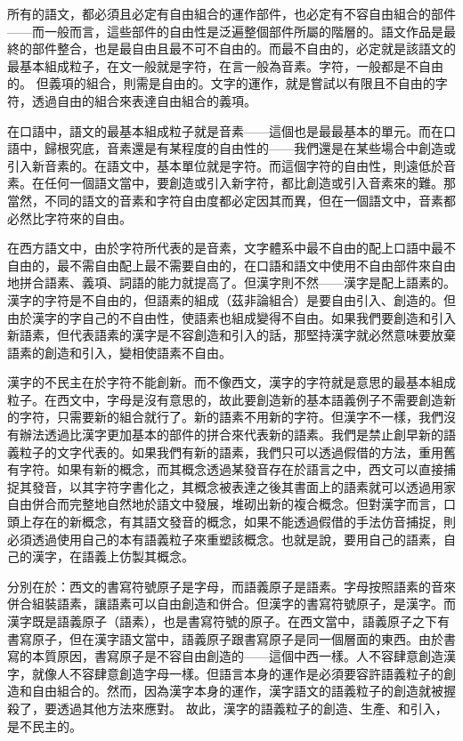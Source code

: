 \documentclass[a5paper, 10pt, openany]{book} %
\begin{document}
所有的語文，都必須且必定有自由組合的運作部件，也必定有不容自由組合的部件——而一般而言，這些部件的自由性是泛遍整個部件所屬的階層的。語文作品是最終的部件整合，也是最自由且最不可不自由的。而最不自由的，必定就是該語文的最基本組成粒子，在文一般就是字符，在言一般為音素。字符，一般都是不自由的。 但義項的組合，則需是自由的。文字的運作，就是嘗試以有限且不自由的字符，透過自由的組合來表達自由組合的義項。

在口語中，語文的最基本組成粒子就是音素——這個也是最最基本的單元。而在口語中，歸根究底，音素還是有某程度的自由性的——我們還是在某些場合中創造或引入新音素的。在語文中，基本單位就是字符。而這個字符的自由性，則遠低於音素。在任何一個語文當中，要創造或引入新字符，都比創造或引入音素來的難。那當然，不同的語文的音素和字符自由度都必定因其而異，但在一個語文中，音素都必然比字符來的自由。

在西方語文中，由於字符所代表的是音素，文字體系中最不自由的配上口語中最不自由的，最不需自由配上最不需要自由的，在口語和語文中使用不自由部件來自由地拼合語素、義項、詞語的能力就提高了。但漢字則不然——漢字是配上語素的。漢字的字符是不自由的，但語素的組成（茲非論組合）是要自由引入、創造的。但由於漢字的字自己的不自由性，使語素也組成變得不自由。如果我們要創造和引入新語素，但代表語素的漢字是不容創造和引入的話，那堅持漢字就必然意味要放棄語素的創造和引入，變相使語素不自由。

漢字的不民主在於字符不能創新。而不像西文，漢字的字符就是意思的最基本組成粒子。在西文中，字母是沒有意思的，故此要創造新的基本語義例子不需要創造新的字符，只需要新的組合就行了。新的語素不用新的字符。但漢字不一樣，我們沒有辦法透過比漢字更加基本的部件的拼合來代表新的語素。我們是禁止創早新的語義粒子的文字代表的。如果我們有新的語素，我們只可以透過假借的方法，重用舊有字符。如果有新的概念，而其概念透過某發音存在於語言之中，西文可以直接捕捉其發音，以其字符字書化之，其概念被表達之後其書面上的語素就可以透過用家自由併合而完整地自然地於語文中發展，堆砌出新的複合概念。但對漢字而言，口頭上存在的新概念，有其語文發音的概念，如果不能透過假借的手法仿音捕捉，則必須透過使用自己的本有語義粒子來重塑該概念。也就是說，要用自己的語素，自己的漢字，在語義上仿製其概念。

分別在於：西文的書寫符號原子是字母，而語義原子是語素。字母按照語素的音來併合組裝語素，讓語素可以自由創造和併合。但漢字的書寫符號原子，是漢字。而漢字既是語義原子（語素），也是書寫符號的原子。在西文當中，語義原子之下有書寫原子，但在漢字語文當中，語義原子跟書寫原子是同一個層面的東西。由於書寫的本質原因，書寫原子是不容自由創造的——這個中西一樣。人不容肆意創造漢字，就像人不容肆意創造字母一樣。但語言本身的運作是必須要容許語義粒子的創造和自由組合的。然而，因為漢字本身的運作，漢字語文的語義粒子的創造就被握殺了，要透過其他方法來應對。 故此，漢字的語義粒子的創造、生產、和引入，是不民主的。
\end{document}
